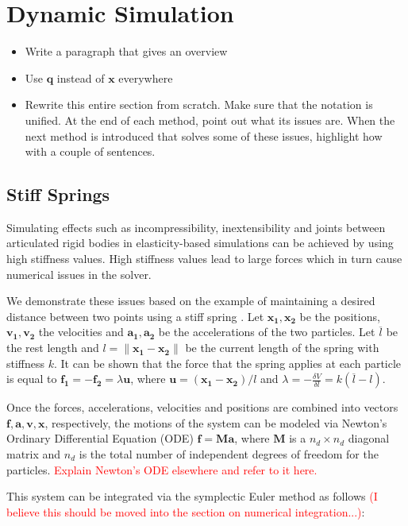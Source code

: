 \section{Dynamic Simulation}\label{s:dynamic-simulation}
\begin{itemize}
    \item Write a paragraph that gives an overview
    \item Use $\bm{q}$ instead of $\bm{x}$ everywhere
    \item Rewrite this entire section from scratch. Make sure that the notation is unified. At the end of each method,
        point out what its issues are. When the next method is introduced that solves some of these issues, highlight
        how with a couple of sentences.
\end{itemize}

\subsection{Stiff Springs}\label{ss:stiff-springs}
Simulating effects such as incompressibility, inextensibility and joints between articulated rigid bodies 
in elasticity-based simulations can be achieved by using high stiffness values. High stiffness values lead to 
large forces which in turn cause numerical issues in the solver. 

We demonstrate these issues based on the example of maintaining a desired distance between two points using a stiff 
spring \cite{tournier2015}. Let $\bm{x_1, x_2}$ be the positions, $\bm{v_1, v_2}$ the velocities and $\bm{a_1, a_2}$
be the accelerations of the two particles. Let $\overline{l}$ be the rest length and $l = \lVert \bm{x_1} - \bm{x_2} \rVert$ 
be the current length of the spring with stiffness $k$. It can be shown that the force that the spring applies at each particle
is equal to $\bm{f_1} = -\bm{f_2} = \lambda\bm{u}$, where $\bm{u} = (\bm{x_1} - \bm{x_2}) / l$
and $\lambda = -\frac{\delta V}{\delta l} = k(\overline{l} - l)$. 

Once the forces, accelerations, velocities and positions are combined into vectors $\bm{f}, \bm{a}, \bm{v}, \bm{x}$, 
respectively, the motions of the system can be modeled via Newton's Ordinary Differential Equation (ODE) $\bm{f} = \bm{Ma}$,
where $\bm{M}$ is a $n_d \times n_d$ diagonal matrix and $n_d$ is the total number of independent degrees of freedom for the 
particles. \textcolor{red}{Explain Newton's ODE elsewhere and refer to it here.}

This system can be integrated via the symplectic Euler method as follows \textcolor{red}{(I believe this should be moved into
the section on numerical integration...)}:

